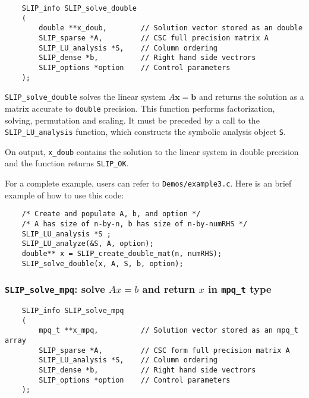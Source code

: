\documentclass[12pt]{article}
\theoremstyle{definition}
\begin{document}
\begin{mdframed}[userdefinedwidth=6in]
{\footnotesize
\begin{verbatim}
    SLIP_info SLIP_solve_double
    (
        double **x_doub,        // Solution vector stored as an double
        SLIP_sparse *A,         // CSC full precision matrix A
        SLIP_LU_analysis *S,    // Column ordering
        SLIP_dense *b,          // Right hand side vectrors
        SLIP_options *option    // Control parameters
    );
\end{verbatim}
} \end{mdframed}

\verb|SLIP_solve_double| solves the linear system $A\mathbf{x}=\mathbf{b}$ and
returns the solution as a matrix accurate to \verb|double| precision. This
function performs factorization, solving, permutation and scaling.  It must be
preceded by a call to the \verb|SLIP_LU_analysis| function, which constructs the
symbolic analysis object \verb|S|.

On output, \verb|x_doub| contains the solution to the linear system in
double precision and the function returns \verb|SLIP_OK|.

For a complete example, users can refer to \verb|Demos/example3.c|. Here is an
brief example of how to use this code:

{\small
\begin{verbatim}
    /* Create and populate A, b, and option */
    /* A has size of n-by-n, b has size of n-by-numRHS */
    SLIP_LU_analysis *S ;
    SLIP_LU_analyze(&S, A, option);
    double** x = SLIP_create_double_mat(n, numRHS);
    SLIP_solve_double(x, A, S, b, option);
\end{verbatim}
}

\cprotect\subsubsection{\verb|SLIP_solve_mpq|: solve $Ax=b$ and return $x$ in \verb|mpq_t| type}
\label{ss:SLIP_solve_mpq}

\begin{mdframed}[userdefinedwidth=6in]
{\footnotesize
\begin{verbatim}
    SLIP_info SLIP_solve_mpq
    (
        mpq_t **x_mpq,          // Solution vector stored as an mpq_t array
        SLIP_sparse *A,         // CSC form full precision matrix A
        SLIP_LU_analysis *S,    // Column ordering
        SLIP_dense *b,          // Right hand side vectrors
        SLIP_options *option    // Control parameters
    );
\end{verbatim}
} \end{mdframed}
\end{document}
